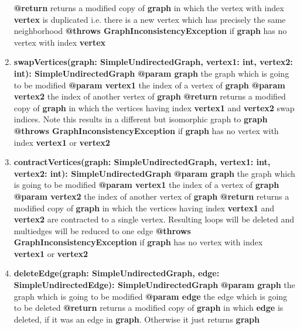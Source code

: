 \begin{enumerate}[+]
{			\textbf{@return} returns a modified copy of \textbf{graph} in which the vertex with index \textbf{vertex} is duplicated i.e. there is a new vertex which has precisely the same neighborhood \newline
			\textbf{@throws GraphInconsistencyException} if \textbf{graph} has no vertex with index \textbf{vertex} 
		}
		\item{
			\textbf{swapVertices(graph: SimpleUndirectedGraph, vertex1: int, vertex2: int): SimpleUndirectedGraph} \newline
			\textbf{@param graph} the graph which is going to be modified \newline
			\textbf{@param vertex1} the index of a vertex of \textbf{graph} \newline
			\textbf{@param vertex2} the index of another vertex of \textbf{graph} \newline
			\textbf{@return} returns a modified copy of \textbf{graph} in which the vertices having index \textbf{vertex1} and \textbf{vertex2} swap indices. Note this results in a different but isomorphic graph to \textbf{graph}  \newline
			\textbf{@throws GraphInconsistencyException} if \textbf{graph} has no vertex with index \textbf{vertex1} or \textbf{vertex2} 
		}
		\item{
			\textbf{contractVertices(graph: SimpleUndirectedGraph, vertex1: int, vertex2: int): SimpleUndirectedGraph} \newline
			\textbf{@param graph} the graph which is going to be modified \newline
			\textbf{@param vertex1} the index of a vertex of \textbf{graph} \newline
			\textbf{@param vertex2} the index of another vertex of \textbf{graph} \newline
			\textbf{@return} returns a modified copy of \textbf{graph} in which the vertices having index \textbf{vertex1} and \textbf{vertex2} are contracted to a single vertex. Resulting loops will be deleted and multiedges will be reduced to one edge \newline
			\textbf{@throws GraphInconsistencyException} if \textbf{graph} has no vertex with index \textbf{vertex1} or \textbf{vertex2} 
		}
		\item{
			\textbf{deleteEdge(graph: SimpleUndirectedGraph, edge: SimpleUndirectedEdge): SimpleUndirectedGraph} \newline
			\textbf{@param graph} the graph which is going to be modified \newline
			\textbf{@param edge} the edge which is going to be deleted \newline
			\textbf{@return} returns a modified copy of \textbf{graph} in which \textbf{edge} is deleted, if it was an edge in \textbf{graph}. Otherwise it just returns \textbf{graph}
		}
		

\end{enumerate}
